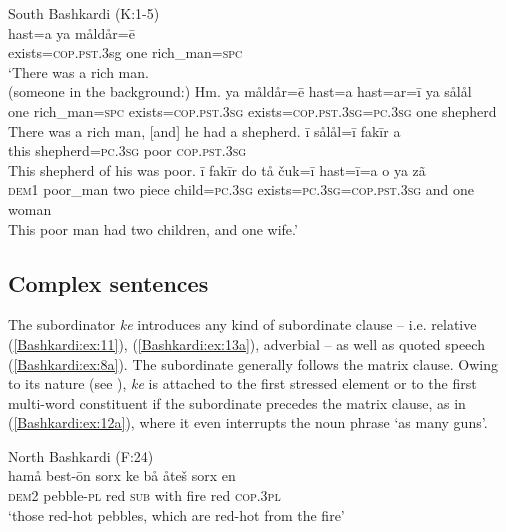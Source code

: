 \documentclass[output=paper,colorlinks,citecolor=brown]{langscibook}
\begin{document}
\ea\label{Bashkardi:ex:10}
South Bashkardi (K:1-5) \\
\ea\label{Bashkardi:ex:10a}
\gll hast=a ya måldår=ē \\
exists=\textsc{cop}\textsc{.pst}.3sg one rich\_man\textsc{=spc} \\
\glt `There was a rich man. \\ {\hspace{-1cm}} (someone in the background:) Hm.
\ex\label{Bashkardi:ex:10b} 
\gll ya måldår=ē hast=a {\hspace{3cm}} hast=ar=ī ya sålål \\
one rich\_man\textsc{=spc} exists=\textsc{cop.pst}\textsc{.3sg} {} 
exists\textsc{=cop.pst.3sg}\textsc{=pc.3sg} one shepherd \\
\glt There was a rich man, [and] he had a shepherd.
\ex\label{Bashkardi:ex:10c} 
\gll ī sålål=ī fakīr a \\
this shepherd\textsc{=pc.3sg} poor \textsc{cop.pst.3sg} \\
\glt This shepherd of his was poor.
\ex\label{Bashkardi:ex:10d} 
\gll ī fakīr do tå čuk=ī hast=ī=a o ya zã \\
\textsc{dem1} poor\_man two piece child\textsc{=pc.3sg} exists\textsc{=pc.3sg}\textsc{=cop.pst}\textsc{.3sg} and one woman \\
\glt This poor man had two children, and one wife.'
\z
\z

\subsection{Complex sentences}\label{Bashkardi:ss:2.3}

The {subordinator} \textit{ke} introduces any kind of subordinate clause – i.e. relative (\ref{Bashkardi:ex:11}),  (\ref{Bashkardi:ex:13a}), adverbial – as well as quoted speech (\ref{Bashkardi:ex:8a}). The subordinate generally follows the matrix clause. Owing to its  nature (see ), \textit{ke} is attached to the first stressed element or to the first multi-word constituent if the subordinate precedes the matrix clause, as in (\ref{Bashkardi:ex:12a}), where it even interrupts the noun phrase `as many guns'.

\ea\label{Bashkardi:ex:11}
North Bashkardi (F:24) \\
\gll hamå best-ōn sorx ke bå åteš sorx en \\
\textsc{dem2} pebble\textsc{-pl} red \textsc{sub} with fire red \textsc{cop.3pl} \\
\glt `those red-hot pebbles, which are red-hot from the fire'
\z
\end{document}
